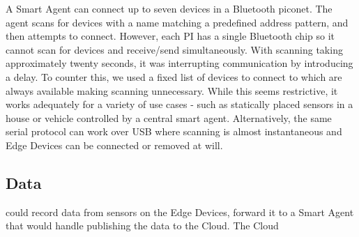 A Smart Agent can connect up to seven devices in a Bluetooth piconet. The agent scans for devices with a name matching a predefined address pattern, and then attempts to connect. However, each PI has a single Bluetooth chip so it cannot scan for devices and receive/send simultaneously. With scanning taking approximately twenty seconds, it was interrupting communication by introducing a delay. To counter this, we used a fixed list of devices to connect to which are always available making scanning unnecessary. While this seems restrictive, it works adequately for a variety of use cases - such as statically placed sensors in a house or vehicle controlled by a central smart agent. Alternatively, the same serial protocol can work over USB where scanning is almost instantaneous and Edge Devices can be connected or removed at will.




\subsection{Data}
could record data from sensors on the Edge Devices, forward it to a Smart Agent that would handle publishing the data to the Cloud. The Cloud  

